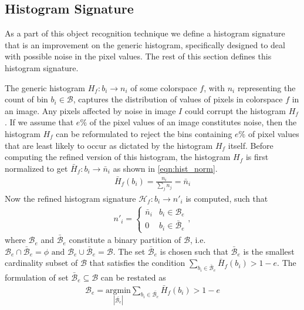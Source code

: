 \documentclass {udthesis}
\begin{document}
\subsection{Histogram Signature}
\label{sec:hist_signature}

As a part of this object recognition technique we define a histogram signature that is an improvement on the generic histogram, specifically designed to deal with possible noise in the pixel values. The rest of this section defines this histogram signature.

The generic histogram $H_f:b_i\to n_i$ of some colorspace $f$, with $n_i$ representing the count of bin $b_i \in \mathcal{B}$, captures the distribution of values of pixels in colorspace $f$ in an image. Any pixels affected by noise in image $I$ could corrupt the histogram $H_f$. If we assume that $e\%$ of the pixel values of an image constitutes noise, then the histogram $H_f$ can be reformulated to reject the bins containing $e\%$ of pixel values that are least likely to occur as dictated by the histogram $H_f$ itself. Before computing the refined version of this histogram, the histogram $H_f$ is first normalized to get $\bar{H}_f:b_i\to \bar{n}_i$ as shown in \eqref{eqn:hist_norm}.
%
\begin{align}	\label{eqn:hist_norm}
 \bar{H}_f(b_i)=\frac{n_i}{\sum_{j}n_j}=\bar{n}_i
\end{align}
Now the refined histogram signature $\mathcal{H}_f:b_i\to n'_i$ is computed, such that
\begin{align}
  n'_i = 
  \begin{cases}
     \bar{n}_i & b_i \in \mathcal{B}_e\\
     0	&	b_i \in \bar{\mathcal{B}}_e
  \end{cases},
\end{align}
%
where $\mathcal{B}_e$ and $\bar{\mathcal{B}}_e$ constitute a binary partition of $\mathcal{B}$, 
i.e. $\mathcal{B}_e \cap \bar{\mathcal{B}}_e = \phi \text{ and } 
\mathcal{B}_e \cup \bar{\mathcal{B}}_e = \mathcal{B}$. 
The set $\bar{\mathcal{B}}_e$ is chosen such that 
$\bar{\mathcal{B}}_e$ is the smallest cardinality subset of 
$\mathcal{B}$ that satisfies the condition $\sum_{b_i \in \bar{\mathcal{B}}_e} \bar{H}_f(b_i) > 1-e$. 
The formulation of set $\bar{\mathcal{B}}_e\subseteq\mathcal{B}$ can be restated as
\begin{align}
 \mathcal{{B}}_e=\underset{|\bar{\mathcal{B}_e}|} {\mathrm{argmin}} \sum_{b_i \in \bar{\mathcal{B}_e}} \bar{H}_f(b_i) > 1-e
\end{align}
\end{document}
